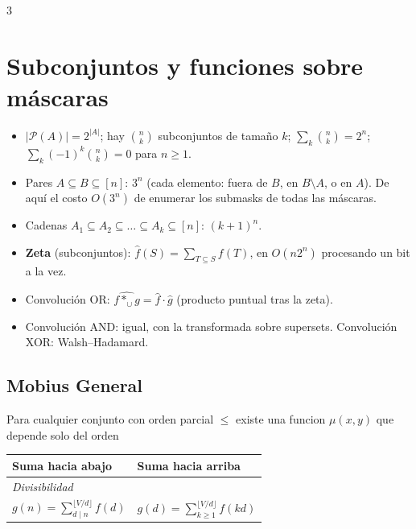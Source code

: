 \documentclass[8pt, spanish, mexico, letterpaper]{extarticle}
\newcommand{\<}{<}
\newcommand{\Pw}{\mathcal{P}}
\newcommand{\card}[1]{\left|#1\right|}
\begin{document}
\begin{multicols*}{3}
\section{Subconjuntos y funciones sobre m\'ascaras}
\begin{itemize}
  \item $\card{\Pw(A)}=2^{\card A}$; hay $\binom nk$ subconjuntos de tama\~no $k$; $\sum_k\binom nk=2^n$; $\sum_k(-1)^k\binom nk=0$ para $n\ge1$.
  \item Pares $A\subseteq B\subseteq[n]$: $3^n$ (cada elemento: fuera de $B$, en $B\setminus A$, o en $A$).
        De aqu\'i el costo $O(3^n)$ de enumerar los submasks de todas las m\'ascaras.
  \item Cadenas $A_1\subseteq A_2\subseteq\dots\subseteq A_k\subseteq[n]$: $(k+1)^n$.
  \item \textbf{Zeta} (subconjuntos): $\hat f(S)=\sum_{T\subseteq S}f(T)$, en $O(n2^n)$ procesando un bit a la vez.
  \item Convoluci\'on OR: $\widehat{f*_{\cup}g}=\hat f\cdot\hat g$ (producto puntual tras la zeta).
  \item Convoluci\'on AND: igual, con la transformada sobre supersets. Convoluci\'on XOR: Walsh--Hadamard.
\end{itemize}
\newcommand{\piso}[1]{\lfloor#1\rfloor}

\subsection{Mobius General}
 Para cualquier conjunto con orden parcial $\leq$ existe una funcion $\mu(x,y)$ que depende solo del orden
\begin{center}
\small
\renewcommand{\arraystretch}{1.3}
\begin{tabular}{ll}
\hline
Suma hacia abajo & Suma hacia arriba \\
\hline \hline 
  \textit{Divisibilidad} \\
  $g(n)=\displaystyle\sum_{d\mid n}^{\piso{V/d}}f(d)$
  & $g(d)=\displaystyle\sum_{k\ge1}^{\piso{V/d}}f(kd)$ \\
  

\end{tabular}
\end{center}
\end{multicols*}
\end{document}
